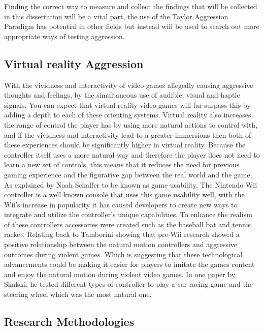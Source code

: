\documentclass[journal]{IEEEtran}
\begin{document}
Finding the correct way to measure and collect the findings that will be collected in this dissertation will be a vital part, the use of the Taylor Aggression Paradigm has potential in other fields but instead will be used to search out more appropriate ways of testing aggression.


    \subsection{Virtual reality Aggression}
        With the vividness and interactivity of video games allegedly causing aggressive thoughts and feelings, by the simultaneous use of audible, visual and haptic signals. You can expect that virtual reality video games will far surpass this by adding a depth to each of these orienting systems\cite{Tamborini}. Virtual reality also increases the range of control the player has by using more natural actions to control with, and if the vividness and interactivity lead to a greater immersions\cite{Steuer} then both of these experiences should be significantly higher in virtual reality. Because the controller itself uses a more natural way and therefore the player does not need to learn a new set of controls, this means that it reduces the need for previous gaming experience and the figurative gap between the real world and the game. As explained by Noah Schaffer to be known as game usability\cite{Schaffer}. The Nintendo Wii controller is a well known console that uses this game usability well, with the Wii’s increase in popularity it has caused developers to create new ways to integrate and utilize the controller's unique capabilities. To enhance the realism of these controllers accessories were created such as the baseball bat and tennis racket. Relating back to Tamborini showing that pre-Wii research showed a positive relationship between the natural motion controllers and aggressive outcomes during violent games\cite{Tamborini}. Which is suggesting that these technological advancements could be making it easier for players to imitate the games content and enjoy the natural motion during violent video games. In one paper by Skalski, he tested different types of controller to play a car racing game and the steering wheel which was the most natural one\cite{Skalski}.





    \subsection{Research Methodologies}
    
\end{document}
